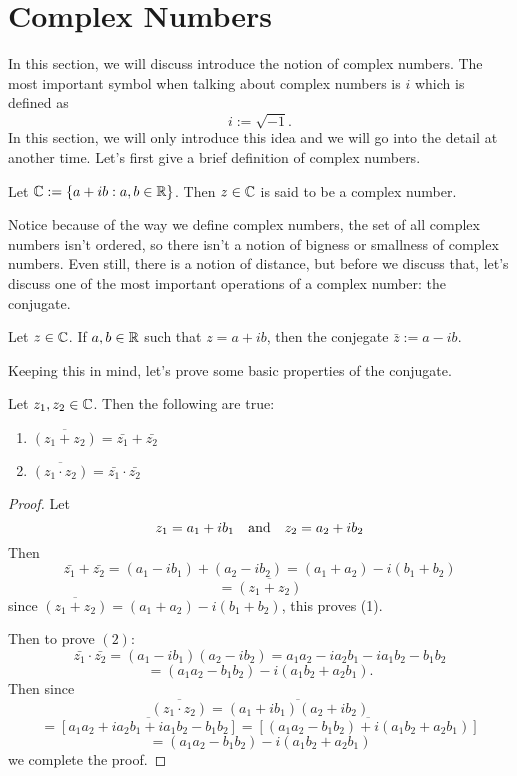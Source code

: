 \section{Complex Numbers}
In this section, we will discuss introduce the notion of complex numbers. The most important symbol when talking about complex numbers is $i$ which is defined as
$$i:=\sqrt{-1}.$$
In this section, we will only introduce this idea and we will go into the detail at another time. Let's first give a brief definition of complex numbers.

\begin{define}
	Let $\mathbb{C}:=\{a+ib:a,b\in\mathbb{R}\}$. Then $z\in\mathbb{C}$ is said to be a complex number.
\end{define}

Notice because of the way we define complex numbers, the set of all complex numbers isn't ordered, so there isn't a notion of bigness or smallness of complex numbers. Even still, there is a notion of distance, but before we discuss that, let's discuss one of the most important operations of a complex number: the conjugate.

\begin{define}
Let $z\in\mathbb{C}$. If $a,b\in\mathbb{R}$ such that $z=a+ib$, then the conjegate $\bar{z}:=a-ib$.	
\end{define}

Keeping this in mind, let's prove some basic properties of the conjugate.

\begin{theorem}
\label{thm:conjpassthrough}
Let $z_1,z_2\in\mathbb{C}$. Then the following are true:
\begin{enumerate}
	\item $\overline{(z_1+z_2)}=\bar{z_1}+\bar{z_2}$
	\item $\overline{(z_1\cdot z_2)}=\bar{z_1}\cdot \bar{z_2}$
\end{enumerate}	
\end{theorem}
\begin{proof}
	Let
	$$z_1=a_1+ib_1 \quad\text{and}\quad z_2=a_2+ib_2$$
	Then
	$$\bar{z_1}+\bar{z_2}=(a_1-ib_1)+(a_2-ib_2)=(a_1+a_2)-i(b_1+b_2)$$
	$$=\overline{(z_1+z_2)}$$
	since $\overline{(z_1+z_2)}=(a_1+a_2)-i(b_1+b_2)$, this proves (1).
	
	Then to prove $(2)$:
	$$\bar{z_1}\cdot \bar{z_2}=(a_1-ib_1)(a_2-ib_2)=a_1a_2-ia_2b_1-ia_1b_2-b_1b_2$$
	$$=(a_1a_2-b_1b_2)-i(a_1b_2+a_2b_1).$$
	Then since 
	$$\overline{(z_1\cdot z_2)}=\overline{(a_1+ib_1)(a_2+ib_2)}$$
	$$=\overline{[a_1a_2+ia_2b_1+ia_1b_2-b_1b_2]}=\overline{[(a_1a_2-b_1b_2)+i(a_1b_2+a_2b_1)]}$$
	$$=(a_1a_2-b_1b_2)-i(a_1b_2+a_2b_1)$$
	we complete the proof.
\end{proof}

